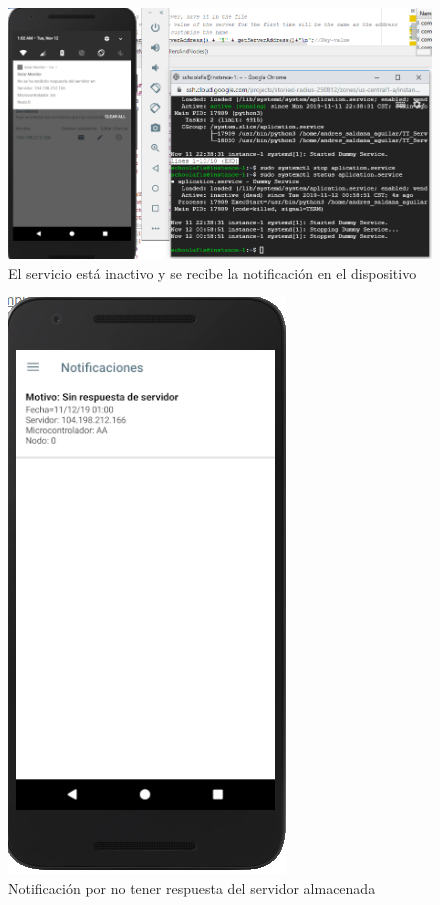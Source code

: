 \begin{figure}[H]
	\centering
	\includegraphics[scale=.65]{Capitulo5/images/muestra6.png}
	\caption{El servicio está inactivo y se recibe la notificación en el dispositivo}	
	\label{fig:muestra 6}
\end{figure} 

\begin{figure}[H]
	\centering
	\includegraphics[scale=.7]{Capitulo5/images/muestra7.png}
	\caption{Notificación por no tener respuesta del servidor almacenada}	
	\label{fig:muestra 7}
\end{figure} 

